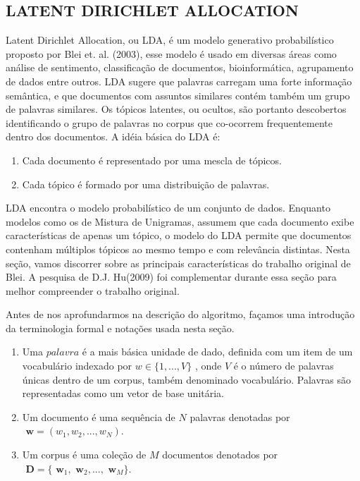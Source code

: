 \documentclass[12pt,a4paper]{article}
\begin{document}
  \subsection{LATENT DIRICHLET ALLOCATION}
  
  Latent Dirichlet Allocation, ou LDA, é um modelo generativo probabilístico proposto por Blei et. al. (2003), esse modelo é usado em diversas áreas como análise de sentimento, classificação de documentos, bioinformática, agrupamento de dados entre outros. LDA sugere que palavras carregam uma forte informação semântica, e que documentos com assuntos similares contém também um grupo de palavras similares. Os tópicos latentes, ou ocultos, são portanto descobertos identificando o grupo de palavras no corpus que co-ocorrem frequentemente dentro dos documentos. A idéia básica do LDA é:
  
  \begin{enumerate}
    \item Cada documento é representado por uma mescla de tópicos.
    \item Cada tópico é formado por uma distribuição de palavras.
  \end{enumerate}
  
  LDA encontra o modelo probabilístico de um conjunto de dados. Enquanto modelos como os de Mistura de Unigramas, assumem que cada documento exibe características de apenas um tópico, o modelo do LDA  permite que documentos contenham múltiplos tópicos ao mesmo tempo e com relevância distintas. Nesta seção, vamos discorrer sobre as principais características do trabalho original de Blei. A pesquisa de D.J. Hu(2009) foi complementar durante essa seção para melhor compreender o trabalho original.
  
  Antes de nos aprofundarmos na descrição do algoritmo, façamos uma introdução da terminologia formal e notações usada nesta seção.
  
  \begin{enumerate}
    \item Uma $palavra$ é a mais básica unidade de dado, definida com um item de um vocabulário indexado por \(w \in \{1,. . . , V\}\)  , onde $V$ é o número de palavras únicas dentro de um corpus, também denominado vocabulário. Palavras são representadas como um vetor de base unitária.
    \item Um documento é uma sequência de $N$ palavras denotadas por \(\textbf{ w} = (w_1, w_2,. . . ,  w_N)\).
    \item Um corpus é uma coleção de $M$ documentos denotados por \(\textbf{ D} = \{\textbf{ w}_1, \textbf{ w}_2, . . ., \textbf{ w}_M\}\).
  \end{enumerate}
  
\end{document}
